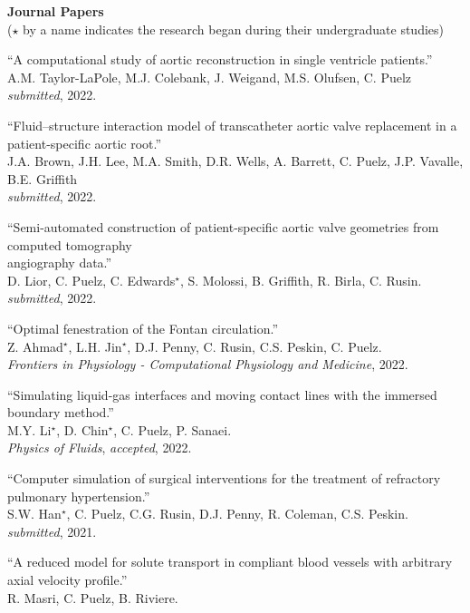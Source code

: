 \documentclass{article} %
\begin{document}
\vspace{0.5cm}
\noindent
{\bf \large Journal Papers}\\
{\footnotesize($\star$ by a name indicates the research began during their undergraduate studies)}
\begin{etaremune}
\item ``A computational study of aortic reconstruction in single ventricle patients.'' \\
A.M. Taylor-LaPole, M.J. Colebank, J. Weigand, M.S. Olufsen, C. Puelz \\
{\em submitted}, 2022.
\item ``Fluid–structure interaction model of transcatheter aortic valve replacement in a patient-specific aortic root.'' \\
J.A. Brown, J.H. Lee, M.A. Smith, D.R. Wells, A. Barrett, C. Puelz, J.P. Vavalle, B.E. Griffith \\
{\em submitted}, 2022.
\item ``Semi-automated construction of patient-specific aortic valve geometries from computed tomography\\ angiography data.'' \\
D. Lior, C. Puelz, C. Edwards$^\star$, S. Molossi, B. Griffith, R. Birla, C. Rusin. \\
{\em submitted}, 2022.
\item ``Optimal fenestration of the Fontan circulation.'' \\
Z. Ahmad$^\star$, L.H. Jin$^\star$, D.J. Penny, C. Rusin, C.S. Peskin, C. Puelz. \\
{\em Frontiers in Physiology - Computational Physiology and Medicine}, 2022.
\item ``Simulating liquid-gas interfaces and moving contact lines with the immersed boundary method.'' \\
M.Y. Li$^\star$, D. Chin$^\star$, C. Puelz, P. Sanaei. \\
{\em Physics of Fluids}, {\em accepted}, 2022.
\item ``Computer simulation of surgical interventions for the treatment of refractory pulmonary hypertension.'' \\
S.W. Han$^\star$, C. Puelz, C.G. Rusin, D.J. Penny, R. Coleman, C.S. Peskin. \\
{\em submitted}, 2021.
\item ``A reduced model for solute transport in compliant blood vessels with arbitrary axial velocity profile.'' \\
R. Masri, C. Puelz, B. Riviere. \\

\end{etaremune}
\end{document}

